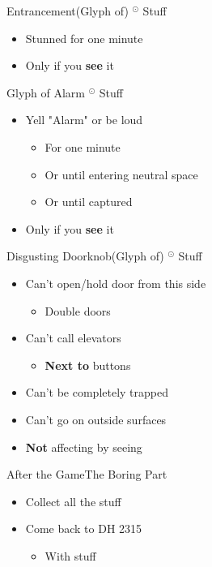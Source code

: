 \documentclass[17pt]{beamer}
\newcommand{\subitem}[1]{\begin{itemize} \item #1 \end{itemize}}
\newcommand{\sep}{ $^\odot$ }
\begin{document}
\begin{frame}{Entrancement}{(Glyph of) \sep Stuff}
  \begin{itemize}
  \item Stunned for one minute
  \item Only if you \textbf{see} it
  \end{itemize}
\end{frame}

\begin{frame}{Glyph of Alarm}{\sep Stuff}
  \begin{itemize}
  \item Yell "Alarm" or be loud
  \begin{itemize}
    \item For one minute
    \item Or until entering neutral space
    \item Or until captured
  \end{itemize}
  \item Only if you \textbf{see} it
  \end{itemize}
\end{frame}

\begin{frame}{Disgusting Doorknob}{(Glyph of) \sep Stuff}
  \begin{itemize}
  \item Can't open/hold door from this side
  \subitem{Double doors}
  \item Can't call elevators
  \subitem{\textbf{Next to} buttons}
  \item Can't be completely trapped
  \item Can't go on outside surfaces
  \item \textbf{Not} affecting by seeing
  \end{itemize}
\end{frame}

\begin{frame}{After the Game}{The Boring Part}
  \begin{itemize}
     \item Collect all the stuff
     \item Come back to DH 2315
     \subitem{With stuff}
   \end{itemize}
\end{frame}
\end{document}
